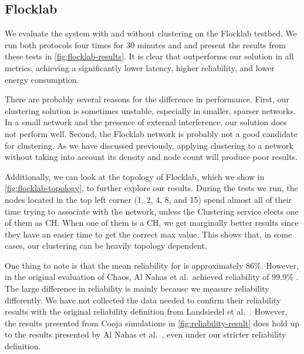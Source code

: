 \subsection{Flocklab}
We evaluate the \atwo{} system with and without clustering on the Flocklab testbed. We run both protocols four times for 30 minutes and and present the results from these tests in \cref{fig:flocklab-results}. It is clear that \atwo{} outperforms our solution in all metrics, achieving a significantly lower latency, higher reliability, and lower energy consumption.

There are probably several reasons for the difference in performance. First, our clustering solution is sometimes unstable, especially in smaller, sparser networks. In a small network and the presence of external interference, our solution does not perform well. Second, the Flocklab network is probably not a good candidate for clustering. As we have discussed previously, applying clustering to a network without taking into account its density and node count will produce poor results.

Additionally, we can look at the topology of Flocklab, which we show in \cref{fig:flocklab-topology}, to further explore our results. During the tests we run, the nodes located in the top left corner (1, 2, 4, 8, and 15) spend almost all of their time trying to associate with the network, unless the Clustering service elects one of them as CH. When one of them is a CH, we get marginally better results since they have an easier time to get the correct max value. This shows that, in some cases, our clustering can be heavily topology dependent.

One thing to note is that the mean reliability for \atwo{} is approximately $86\%$. However, in the original evaluation of Chaos, Al Nahas et al.~achieved reliability of $99.9\%$ \cite{chaos-introduction-paper}. The large difference in reliability is mainly because we measure reliability differently. We have not collected the data needed to confirm their reliability results with the original reliability definition from Landsiedel et al.~\cite{chaos-introduction-paper}. However, the results presented from Cooja simulations in \cref{fig:reliability-result} does hold up to the results presented by Al Nahas et al.~\cite{a2-introduction-paper}, even under our stricter reliability definition.

